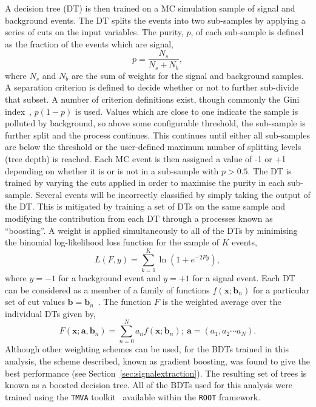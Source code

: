 A decision tree (DT) is then trained on a MC simulation sample of signal and background 
events. The DT splits the events into two sub-samples by applying a series of cuts
on the input variables. The purity, $p$, of each sub-sample is defined as 
the fraction of the events which are signal, 
\begin{equation}
p = \frac{N_{s}}{N_{s}+N_{b}},
\end{equation}
where $N_{s}$ and $N_{b}$ are the sum of weights for the signal and background samples.
A separation criterion is defined to decide whether or not to further sub-divide
that subset. A number of criterion definitions exist, though commonly the 
Gini index~\citep{tmva}, $p(1-p)$ is used. Values which are close to one indicate 
the sample is polluted by background, so above some configurable threshold, 
the sub-sample is further split and the process continues. 
This continues until either all sub-samples are below the threshold or the
user-defined maximum number of splitting levels (tree depth) is reached. 
Each MC event is then assigned a value of -1 or +1 depending on whether it is
or is not in a sub-sample with $p>0.5$. The DT is trained by varying the cuts 
applied in order to maximise the purity in each sub-sample.
Several events will be incorrectly classified by simply taking the output of the DT.
This is mitigated by training a set of DTs on the same sample and modifying the 
contribution from each DT through a processes known as ``boosting''. 
A weight is applied simultaneously to all of the DTs by minimising the 
binomial log-likelihood loss function for the sample of $K$ events,
\begin{equation}
L(F,y) = \sum_{k=1}^{K} \ln\left(1+e^{-2 Fy} \right),
\end{equation}
where $y=-1$ for a background event and $y=+1$ for a signal event.
Each DT can be considered as a member of a family of functions $f(\mathbf{x};\mathbf{b}_{n})$ 
for a particular set of cut values $\mathbf{b}=\mathbf{b}_{n}$~\citep{friedmanbdt}.
The function $F$ is the weighted average over the individual DTs given by,
\begin{equation}
F(\mathbf{x};\mathbf{a},\mathbf{b}_{n}) = 
	\sum_{n=0}^{N}a_{n}f(\mathbf{x};\mathbf{b}_{n});~\mathbf{a}=(a_{1},a_{2}\cdots a_{N}).
\end{equation}
Although other weighting schemes can be used, for the BDTs trained in this analysis, 
the scheme described, known as gradient boosting, was found to give the best performance 
(see Section~\ref{sec:signalextraction}).
The resulting set of trees is known as a boosted decision tree. 
All of the BDTs used for this analysis were trained using the \texttt{TMVA} 
toolkit~\citep{tmva} available within the \texttt{ROOT} framework.
